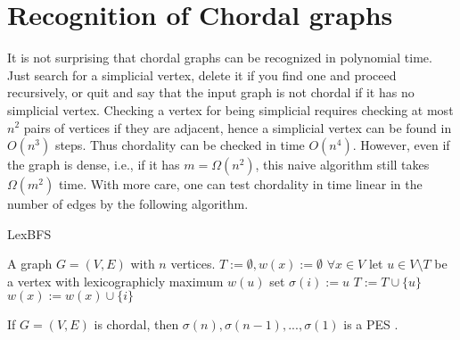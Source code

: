 \chapter{Recognition of Chordal graphs}

It is not surprising that chordal graphs can be recognized in polynomial time. Just search for a simplicial vertex, delete it if you find one and proceed recursively, or quit and say that the input graph
is not chordal if it has no simplicial vertex. Checking a vertex for being simplicial requires checking at most $n^2$ pairs of vertices if they are adjacent, hence a simplicial vertex can be found in $O(n^3)$ steps. Thus chordality can be checked in time $O(n^4)$. However, even if the graph is dense, i.e., if it has $m = \Omega(n^2)$, this naive algorithm still takes $\Omega(m^2)$ time. With more care, one can test chordality in time linear in the number of edges by the following algorithm.

\begin{algorithm}[!ht]
	\caption{LexBFS}
	\begin{algorithmic}[1]
		\Require A graph $G = (V,E)$ with $n$ vertices.
		\State $T := \emptyset, w(x) := \emptyset$ $\forall x \in V$
			\State let $u \in V \setminus T$ be a vertex with lexicographicly maximum $w(u)$
			\State set $\sigma(i) := u$
			\State $T := T \cup \{u\}$
				\State $w(x) := w(x) \cup \{i\}$
			\EndFor
		\EndFor
	\end{algorithmic}
\end{algorithm}

\begin{thm}
	If $G = (V, E)$ is chordal, then $\sigma(n), \sigma(n - 1), . . . , \sigma(1)$ is a PES \faDog.
\end{thm}

